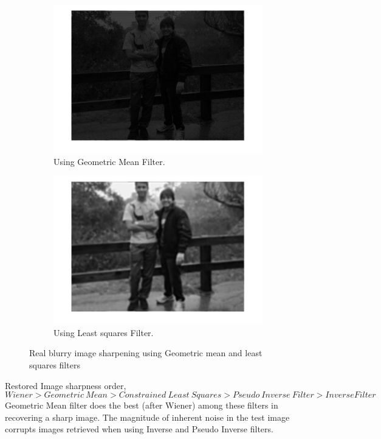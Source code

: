 \begin{figure}[H]
        \centering
        \begin{subfigure}[b]{0.49\textwidth}
                \centering
                \includegraphics[width=\textwidth]{geo_mean.jpg}
                \caption{Using Geometric Mean Filter.}
        \end{subfigure}
        \begin{subfigure}[b]{0.49\textwidth}
                 \centering
                 \includegraphics[width=\textwidth]{least_squares.jpg}
                 \caption{Using Least squares Filter.}
                 \label{fig:friends}
                       
        \end{subfigure}             
        \caption{Real blurry image sharpening using Geometric mean and least squares filters}
\end{figure}

Restored Image sharpness order,
\begin{equation*}
Wiener > Geometric~Mean > Constrained~Least~Squares > Pseudo~Inverse~Filter > Inverse Filter
\end{equation*}
\noindent Geometric Mean filter does the best (after Wiener) among these filters in recovering a sharp image. The magnitude of inherent noise in the test image corrupts images retrieved when using Inverse and Pseudo Inverse filters.
\newpage